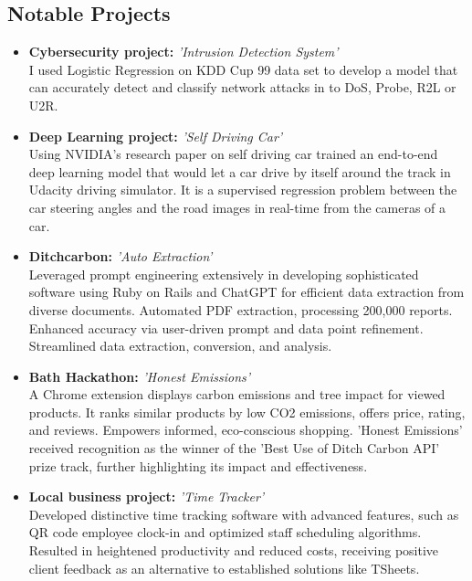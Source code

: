\documentclass[11pt,a4paper,sans]{moderncv}        %
\begin{document}
\begin{multicols}{2}
\subsection{Notable Projects}
\begin{itemize}
\item{{\textbf{Cybersecurity project:} \textit{'Intrusion Detection System'}\\ 
\small{I used Logistic Regression on KDD Cup 99 data set to develop a model that can accurately detect and classify network attacks in to DoS, Probe, R2L or U2R.}}}
\vspace{6pt}
\item{{\textbf{Deep Learning project:} \textit{'Self Driving Car'}\\ 
\small{Using NVIDIA's research paper on self driving car trained an end-to-end deep learning model that would let a car drive by itself around the track in Udacity driving simulator. It is a supervised regression problem between the car steering angles and the road images in real-time from the cameras of a car. }}}
\vspace{6pt}
\item{{\textbf{Ditchcarbon:} \textit{'Auto Extraction'}\\ 
\small{Leveraged prompt engineering extensively in developing sophisticated software using Ruby on Rails and ChatGPT for efficient data extraction from diverse documents. Automated PDF extraction, processing 200,000 reports. Enhanced accuracy via user-driven prompt and data point refinement. Streamlined data extraction, conversion, and analysis.}}}
\vspace{6pt}
\item{{\textbf{Bath Hackathon:} \textit{'Honest Emissions'} \\
\small{A Chrome extension displays carbon emissions and tree impact for viewed products. It ranks similar products by low CO2 emissions, offers price, rating, and reviews. Empowers informed, eco-conscious shopping. 'Honest Emissions' received recognition as the winner of the 'Best Use of Ditch Carbon API' prize track, further highlighting its impact and effectiveness.}}}
\vspace{6pt}
\item{{\textbf{Local business project:} \textit{'Time Tracker'}\\
\small{Developed distinctive time tracking software with advanced features, such as QR code employee clock-in and optimized staff scheduling algorithms. Resulted in heightened productivity and reduced costs, receiving positive client feedback as an alternative to established solutions like TSheets.}}}
\vspace{6pt}
\end{itemize}


\end{multicols}
\end{document}

